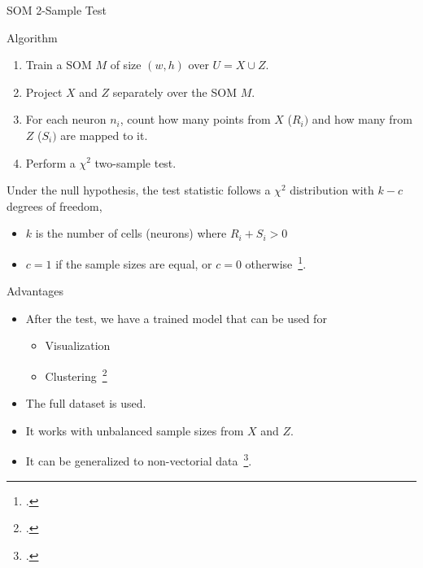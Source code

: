 \documentclass[10pt,compress]{beamer}
\begin{document}

\begin{frame}{SOM 2-Sample Test}
    \begin{block}{Algorithm}
        \begin{enumerate}
        \item Train a SOM $M$ of size $(w, h)$ over $U = X \cup Z$.
        \item Project $X$ and $Z$ separately over the SOM  $M$.
        \item For each neuron $n_i$, count how many points from $X$ ($R_i)$ and how many from $Z$ ($S_i)$ are mapped to it.
        \item Perform a $\chi^2$ two-sample test.
        \end{enumerate}

        Under the null hypothesis, the test statistic follows a $\chi^2$ distribution with $k - c$ degrees of freedom,
        \begin{itemize}
            \item $k$ is the number of cells (neurons) where ${R_i + S_i > 0}$
            \item $c = 1$ if the sample sizes are equal, or $c = 0$ otherwise~\footcite{press1993numerical}.
        \end{itemize}        
    \end{block}
\end{frame}

\begin{frame}{Advantages}
    \begin{itemize}
        \item After the test, we have a trained model that can be used for
            
            \begin{itemize}
                \item Visualization
                \item Clustering~\footcite{ultsch2005esom}
            \end{itemize}

        \item The full dataset is used.
        \item It works with unbalanced sample sizes from $X$ and $Z$.
        \item It can be generalized to non-vectorial data~\footcite{kohonen1982self}.
    \end{itemize}

\end{frame}
\end{document}

